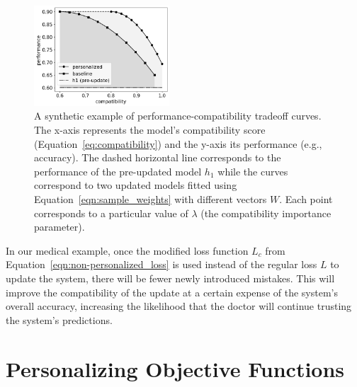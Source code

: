\documentclass[letterpaper]{article} %
\theoremstyle{definition}
\newtheorem{definition}{Definition}
\newcommand{\kibitz}[2]{\ifnum\Comments=1{\color{#1}{#2}}\fi}
\newcommand{\ym}[1]{\kibitz{blue}{[YM:#1]}}
\newcommand{\kg}[1]{\kibitz{red}{[KG:#1]}}
\begin{document}
\begin{figure}[t]
     \centering
     \includegraphics[width=0.45\textwidth]{example_tradeoff}
     \caption{A synthetic example of performance-compatibility tradeoff curves. The x-axis represents the model's compatibility score (Equation~\ref{eq:compatibility}) and the y-axis its performance (e.g., accuracy). The dashed horizontal line corresponds to the performance of the pre-updated model $h_1$ while the curves correspond to two updated models fitted using Equation~\ref{eqn:sample_weights} with different vectors $W$. Each point corresponds to a particular value of $\lambda$ (the compatibility importance parameter).
     }
    \label{fig:example_tradeoff}
\end{figure}
% 
% 
%
In our medical example, once the modified loss function $L_c$ from Equation~\ref{eqn:non-personalized_loss} is used instead of the regular loss $L$ to update the system, there will be fewer newly introduced mistakes. This will improve the compatibility of the update at a certain expense of the system's overall accuracy, increasing the likelihood that the doctor will continue trusting the system's predictions.
%
\section{Personalizing Objective Functions}
\label{sec:personalization}
\end{document}
